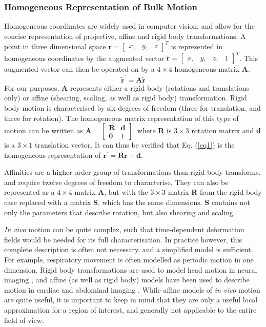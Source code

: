 \documentclass[class=article, crop=false]{standalone}
\begin{document}
\subsubsection*{Homogeneous Representation of Bulk Motion}
Homogeneous coordinates are widely used in computer vision, and allow for the concise representation of projective, affine and rigid body transformations. A point in three dimensional space $\textbf{r} = \begin{bmatrix} x,&y,&z\end{bmatrix}^{T}$ is represented in homogeneous coordinates by the augmented vector $\tilde{\textbf{r}} = \begin{bmatrix}x,&y,&z,&1\end{bmatrix}^{T}$. This augmented vector can then be operated on by a $4\times4$ homogeneous matrix \textbf{A}.
\begin{equation}
	\label{eq1}
	\tilde{\textbf{r}}^{'} = \textbf{A}\tilde{\textbf{r}}
\end{equation}
For our purposes, \textbf{A} represents either a rigid body (rotations and translations only) or affine (shearing, scaling, as well as rigid body) transformation. Rigid body motion is characterised by six degrees of freedom (three for translation, and three for rotation). The homogeneous matrix representation of this type of motion can be written as $\textbf{A} = \begin{bmatrix} \textbf{R} & \textbf{d} \\ \textbf{0} & 1 \end{bmatrix}$, where \textbf{R} is $3\times3$ rotation matrix and \textbf{d} is a $3\times1$ translation vector. It can thus be verified that Eq. (\ref{eq1}) is the homogeneous representation of $\textbf{r}^{'} = \textbf{R} \textbf{r} + \textbf{d}$.
\par
Affinities are a higher order group of transformations than rigid body transforms, and require twelve degrees of freedom to characterise. They can also be represented as a $4\times4$ matrix \textbf{A}, but with the $3\times3$ matrix \textbf{R} from the rigid body case replaced with a matrix \textbf{S}, which has the same dimensions. \textbf{S} contains not only the parameters that describe rotation, but also shearing and scaling.
\par
\textit{In vivo} motion can be quite complex, such that time-dependent deformation fields would be needed for its full characterisation. In practice however, this complete description is often not necessary, and a simplified model is sufficient. For example, respiratory movement is often modelled as periodic motion in one dimension. Rigid body transformations are used to model head motion in neural imaging \parencite{Godenschweger2016}, and affine (as well as rigid body) models have been used to describe motion in cardiac and abdominal imaging \parencite{Nehrke2005,Manke2002,Pipe1999}. While affine models of \textit{in vivo} motion are quite useful, it is important to keep in mind that they are only a useful local approximation for a region of interest, and generally not applicable to the entire field of view.
\end{document}
